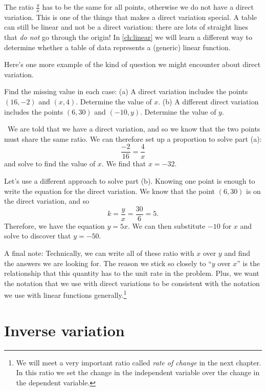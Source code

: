 The ratio $\frac{y}{x}$ has to be the same for all points, otherwise we do not have a direct variation. This is one of the things that makes a direct variation special. A table can still be linear and not be a direct variation: there are lots of straight lines that \textit{do not} go through the origin! In \cref{ch:linear} we will learn a different way to determine whether a table of data represents a (generic) linear function.

Here's one more example of the kind of question we might encounter about direct variation.

\begin{boxedex}
Find the missing value in each case: (a) A direct variation includes the points $(16, -2)$ and $(x, 4)$. Determine the value of $x$. (b) A different direct variation includes the points $(6, 30)$ and $(-10, y)$. Determine the value of $y$.

\exsoln\ We are told that we have a direct variation, and so we know that the two points must share the same ratio. We can therefore set up a proportion to solve part (a):
\[\frac{-2}{16} = \frac{4}{x}\] and solve to find the value of $x$. We find that $x=-32$.

Let's use a different approach to solve part (b). Knowing one point is enough to write the equation for the direct variation. We know that the point $(6,30)$ is on the direct variation, and so \[k = \frac{y}{x} = \frac{30}{6} = 5.\] Therefore, we have the equation $y = 5x$. We can then substitute $-10$ for $x$ and solve to discover that $y=-50$.
\end{boxedex}

A final note: Technically, we can write all of these ratio with $x$ over $y$ and find the answers we are looking for. The reason we stick so closely to ``$y$ over $x$'' is the relationship that this quantity has to the unit rate in the problem. Plus, we want the notation that we use with direct variations to be consistent with the notation we use with linear functions generally.\footnote{We will meet a very important ratio called \textit{rate of change} in the next chapter. In this ratio we set the change in the independent variable over the change in the dependent variable.}



\section{Inverse variation}
\label{sec:inversevar}

